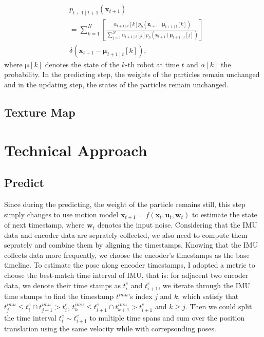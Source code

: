 \documentclass[conference]{IEEEtran}
\begin{document}
\begin{equation}
    \begin{aligned}
    &p_{t+1 \mid t+1}\left(\boldsymbol{x}_{t+1}\right) 
    \\&=\sum_{k=1}^N\left[\frac{\alpha_{t+1 \mid t}[k] p_h\left(\boldsymbol{z}_{t+1} \mid \boldsymbol{\mu}_{t+1 \mid t}[k]\right)}{\sum_{j=1}^N \alpha_{t+1 \mid t}[j] p_h\left(\boldsymbol{z}_{t+1} \mid \boldsymbol{\mu}_{t+1 \mid t}[j]\right)}\right] 
    \\ &\delta\left(\boldsymbol{x}_{t+1}-\boldsymbol{\mu}_{t+1 \mid t}[k]\right),
    \end{aligned}
\end{equation}
where $\boldsymbol{\mu}[k]$ denotes the state of the $k$-th robot at time $t$ and $\alpha[k]$ the probability. In the predicting step, the
weights of the particles remain unchanged and in the updating step, the states of the particles remain unchanged.

\subsection{Texture Map}


\section{Technical Approach}
\subsection{Predict}
Since during the predicting, the weight of the particle remains still, this step simply changes to use motion model 
$\boldsymbol{x}_{t+1} = f(\boldsymbol{x}_{t}, \boldsymbol{u}_{t}, \boldsymbol{w}_{t})$ to estimate the 
state of next timestamp, where $\boldsymbol{w}_{t}$ denotes the input noise. Considering that the IMU data and encoder
data are seprately collected, we also need to compute them seprately and combine them by aligning the timestamps. Knowing
that the IMU collects data more frequently, we choose the encoder's timestamps as the base timeline. To estimate the 
pose along encoder timestamps, I adopted a metric to choose the best-match time interval of IMU, that is: for adjacent 
two encoder data, we denote their time stamps as $t_{i}^e$ and $t_{i+1}^e$, we iterate through the IMU time stamps to find 
the timestamp $t^{imu}$'s index $j$ and $k$, which satisfy that $t_j^{imu} \le t_{i}^e \cap t_{j+1}^{imu} > t_{i}^e$, 
$t_k^{imu} \le t_{i+1}^e \cap t_{k+1}^{imu} > t_{i+1}^e$ and $k \ge j$. Then we could split the time interval $t_{i}^e \sim t_{i+1}^e$
to multiple time spans and sum over the position translation using the same velocity while with correpsonding poses.
\end{document}
